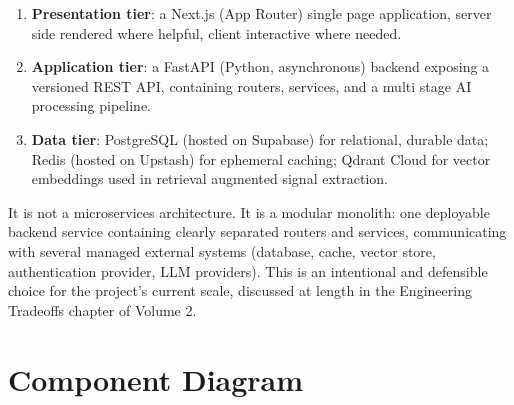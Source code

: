 \documentclass[11pt,a4paper]{report}
\begin{document}
\begin{enumerate}[leftmargin=*]
  \item \textbf{Presentation tier}: a Next.js (App Router) single page application, server side rendered where helpful, client interactive where needed.
  \item \textbf{Application tier}: a FastAPI (Python, asynchronous) backend exposing a versioned REST API, containing routers, services, and a multi stage AI processing pipeline.
  \item \textbf{Data tier}: PostgreSQL (hosted on Supabase) for relational, durable data; Redis (hosted on Upstash) for ephemeral caching; Qdrant Cloud for vector embeddings used in retrieval augmented signal extraction.
\end{enumerate}

It is not a microservices architecture. It is a modular monolith: one deployable backend service containing clearly separated routers and services, communicating with several managed external systems (database, cache, vector store, authentication provider, LLM providers). This is an intentional and defensible choice for the project's current scale, discussed at length in the Engineering Tradeoffs chapter of Volume 2.

\section{Component Diagram}
\end{document}
